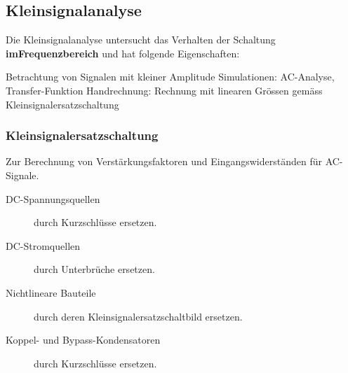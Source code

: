 \subsection{Kleinsignalanalyse}
\label{Kleinsignalanalyse}

Die Kleinsignalanalyse untersucht das Verhalten der Schaltung \textbf{imFrequenzbereich} und hat folgende Eigenschaften:

\smallskip

\begin{outline}
    \1 Betrachtung von Signalen mit kleiner Amplitude
    \1 Simulationen: AC-Analyse, Transfer-Funktion
    \1 Handrechnung: Rechnung mit linearen Grössen gemäss Kleinsignalersatzschaltung
\end{outline}


\subsubsection{Kleinsignalersatzschaltung}
\label{Kleinsignalersatzschaltung}
Zur Berechnung von Verstärkungsfaktoren und Eingangswiderständen für AC-Signale.

\begin{description}
    \item[DC-Spannungsquellen] durch Kurzschlüsse ersetzen.
    \item[DC-Stromquellen] durch Unterbrüche ersetzen. 
    \item[Nichtlineare Bauteile] durch deren Kleinsignalersatzschaltbild ersetzen.
    \item[Koppel- und Bypass-Kondensatoren] durch Kurzschlüsse ersetzen.  
\end{description}


